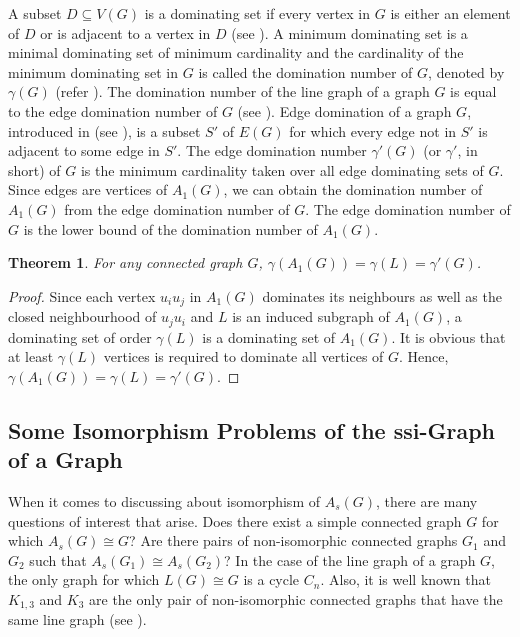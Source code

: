 \documentclass[12pt,a4paper,twoside]{article}
\newtheorem{theorem}{Theorem}[section]
\theoremstyle{casesty}
\theoremstyle{subcasesty}
\theoremstyle{schemesty}
\begin{document}
A subset $D \subseteq V(G)$ is a dominating set if every vertex in $G$ is either an element of $D$ or is adjacent to a vertex in $D$ (see \cite{haynes2023fundamentals}). A minimum dominating set is a minimal dominating set of minimum cardinality and the cardinality of the minimum dominating set in $G$ is called the domination number of $G$, denoted by $\gamma(G)$ (refer \cite{haynes2023fundamentals}). The domination number of the line graph of a graph $G$ is equal to the edge domination number of $G$ (see \cite{murugan2018domination}). Edge domination of a graph $G$, introduced in (see \cite{hedetniemi1977edge}), is a subset $S'$ of $E(G)$ for which every edge not in $S'$ is adjacent to some edge in $S'$. The edge domination number $\gamma'(G)$ (or $\gamma'$, in short) of $G$ is the minimum cardinality taken over all edge dominating sets of $G$. Since edges are vertices of $A_{1}(G)$, we can obtain the domination number of $A_{1}(G)$ from the edge domination number of $G$. The edge domination number of $G$ is the lower bound of the domination number of $A_{1}(G)$. 

\begin{theorem}
	For any connected graph $G$, $\gamma(A_{1}(G))=\gamma(L)=\gamma'(G)$.
\end{theorem}
\begin{proof}
	Since each vertex $u_{i}u_{j}$ in $A_{1}(G)$ dominates its neighbours as well as the closed neighbourhood of $u_{j}u_{i}$ and $L$ is an induced subgraph of $A_{1}(G)$, a dominating set of order $\gamma(L)$ is a dominating set of $A_{1}(G)$. It is obvious that at least $\gamma(L)$ vertices is required to dominate all vertices of $G$. Hence, $\gamma(A_{1}(G))=\gamma(L)=\gamma'(G)$. 
\end{proof}

\subsection{Some Isomorphism Problems of the ssi-Graph of a Graph}

When it comes to discussing about isomorphism of $A_{s}(G)$, there are many questions of interest that arise. Does there exist a simple connected graph $G$ for which $A_{s}(G) \cong G$? Are there pairs of non-isomorphic connected graphs $G_{1}$ and $G_{2}$ such that $A_{s}(G_{1}) \cong A_{s}(G_{2})$? In the case of the line graph of a graph $G$, the only graph for which $L(G) \cong G$ is a cycle $C_{n}$. Also, it is well known that $K_{1,3}$ and $K_{3}$ are the only pair of non-isomorphic connected graphs that have the same line graph (see ). %
\end{document}
